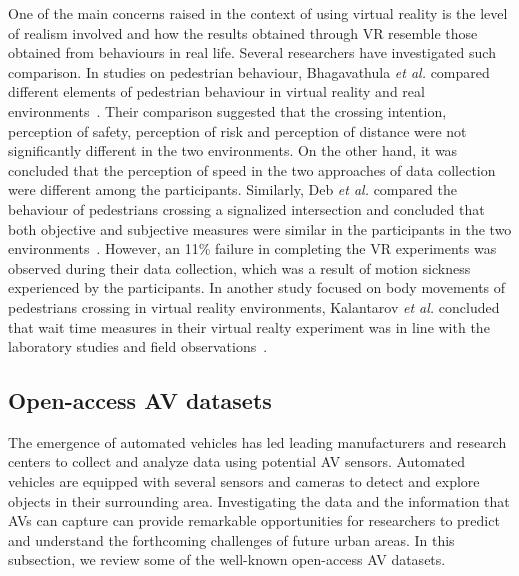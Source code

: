 One of the main concerns raised in the context of using virtual reality is the level of realism involved and how the results obtained through VR resemble those obtained from behaviours in real life. Several researchers have investigated such comparison. In studies on pedestrian behaviour, Bhagavathula \textit{et al.} compared different elements of pedestrian behaviour in virtual reality and real environments~\cite{bhagavathula2018reality}. Their comparison suggested that the crossing intention, perception of safety, perception of risk and perception of distance were not significantly different in the two environments. On the other hand, it was concluded that the perception of speed in the two approaches of data collection were different among the participants. Similarly, Deb \textit{et al.} compared the behaviour of pedestrians crossing a signalized intersection and concluded that both objective and subjective measures were similar in the participants in the two environments~\cite{deb2017efficacy}. However, an 11\% failure in completing the VR experiments was observed during their data collection, which was a result of motion sickness experienced by the participants. In another study focused on body movements of pedestrians crossing in virtual reality environments, Kalantarov \textit{et al.} concluded that wait time measures in their virtual realty experiment was in line with the laboratory studies and field observations~\cite{kalantarov2018pedestrians}.

\subsection{Open-access AV datasets}
The emergence of automated vehicles has led leading manufacturers and research centers to collect and analyze data using potential AV sensors. Automated vehicles are equipped with several sensors and cameras to detect and explore objects in their surrounding area. Investigating the data and the information that AVs can capture can provide remarkable opportunities for researchers to predict and understand the forthcoming challenges of future urban areas. In this subsection, we review some of the well-known open-access AV datasets. 

